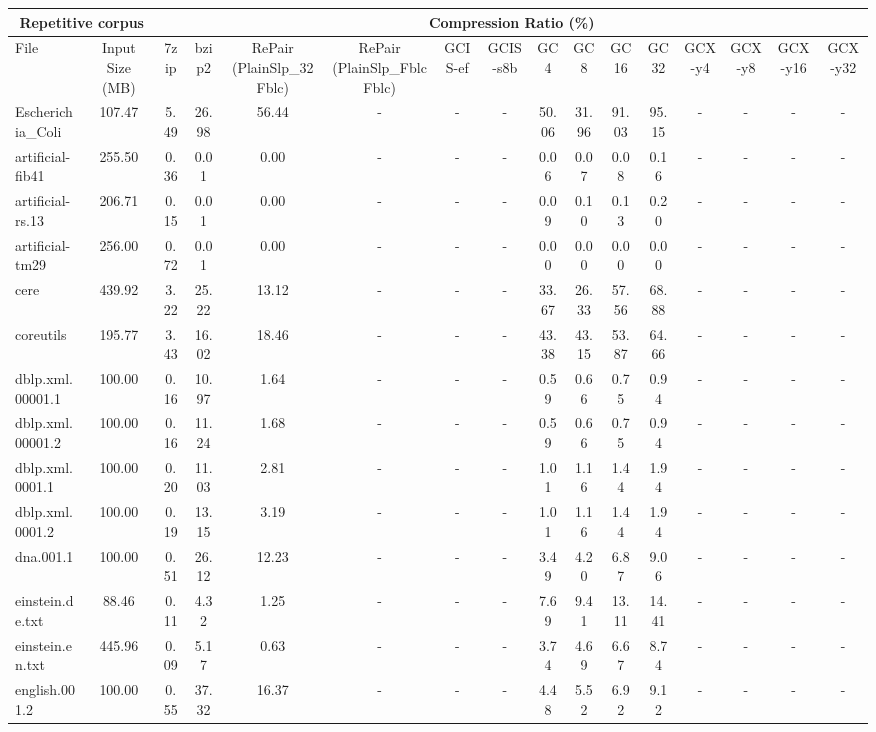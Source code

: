 \begin{table}[]
\centering
\begin{tabular}{|l|c|c|c|c|c|c|c|c|c|c|c|c|c|c|c|}
\hline
\multicolumn{2}{|c|}{Repetitive corpus} & \multicolumn{14}{c|}{Compression Ratio (\%)} \\
\hline
File & Input Size (MB) & 7zip & bzip2 & RePair (PlainSlp\_32Fblc) & RePair (PlainSlp\_FblcFblc) & GCIS-ef & GCIS-s8b & GC4 & GC8 & GC16 & GC32 & GCX-y4 & GCX-y8 & GCX-y16 & GCX-y32 \\
\hline
Escherichia\_Coli & 107.47 & 5.49 & 26.98 & 56.44 & - & - & - & 50.06 & 31.96 & 91.03 & 95.15 & - & - & - & - \\
\hline
artificial-fib41 & 255.50 & 0.36 & 0.01 & 0.00 & - & - & - & 0.06 & 0.07 & 0.08 & 0.16 & - & - & - & - \\
\hline
artificial-rs.13 & 206.71 & 0.15 & 0.01 & 0.00 & - & - & - & 0.09 & 0.10 & 0.13 & 0.20 & - & - & - & - \\
\hline
artificial-tm29 & 256.00 & 0.72 & 0.01 & 0.00 & - & - & - & 0.00 & 0.00 & 0.00 & 0.00 & - & - & - & - \\
\hline
cere & 439.92 & 3.22 & 25.22 & 13.12 & - & - & - & 33.67 & 26.33 & 57.56 & 68.88 & - & - & - & - \\
\hline
coreutils & 195.77 & 3.43 & 16.02 & 18.46 & - & - & - & 43.38 & 43.15 & 53.87 & 64.66 & - & - & - & - \\
\hline
dblp.xml.00001.1 & 100.00 & 0.16 & 10.97 & 1.64 & - & - & - & 0.59 & 0.66 & 0.75 & 0.94 & - & - & - & - \\
\hline
dblp.xml.00001.2 & 100.00 & 0.16 & 11.24 & 1.68 & - & - & - & 0.59 & 0.66 & 0.75 & 0.94 & - & - & - & - \\
\hline
dblp.xml.0001.1 & 100.00 & 0.20 & 11.03 & 2.81 & - & - & - & 1.01 & 1.16 & 1.44 & 1.94 & - & - & - & - \\
\hline
dblp.xml.0001.2 & 100.00 & 0.19 & 13.15 & 3.19 & - & - & - & 1.01 & 1.16 & 1.44 & 1.94 & - & - & - & - \\
\hline
dna.001.1 & 100.00 & 0.51 & 26.12 & 12.23 & - & - & - & 3.49 & 4.20 & 6.87 & 9.06 & - & - & - & - \\
\hline
einstein.de.txt & 88.46 & 0.11 & 4.32 & 1.25 & - & - & - & 7.69 & 9.41 & 13.11 & 14.41 & - & - & - & - \\
\hline
einstein.en.txt & 445.96 & 0.09 & 5.17 & 0.63 & - & - & - & 3.74 & 4.69 & 6.67 & 8.74 & - & - & - & - \\
\hline
english.001.2 & 100.00 & 0.55 & 37.32 & 16.37 & - & - & - & 4.48 & 5.52 & 6.92 & 9.12 & - & - & - & - \\

\end{tabular}
\end{table}
